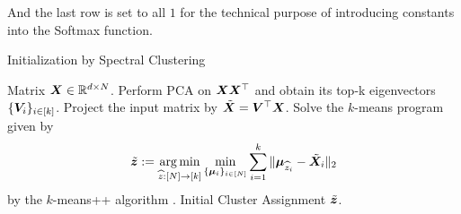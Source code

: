 And the last row is set to all $1$ for the technical purpose of introducing constants into the Softmax function. 
\begin{algorithm}[tb]
   \caption{Initialization by Spectral Clustering}
   \label{alg:example}
\begin{algorithmic}
    Matrix $\boldsymbol{X}\in\mathbb{R}^{d\times N}$.
   \STATE Perform PCA on $\boldsymbol{X}\boldsymbol{X}^\top$ and obtain its top-k eigenvectors $\{\boldsymbol{V}_i\}_{i\in[k]}$.
   \STATE Project the input matrix by $\tilde{\boldsymbol{X}}=\boldsymbol{V}^\top \boldsymbol{X}$.
   \STATE Solve the $k$-means program given by 
   \begin{align*}
       \tilde{\boldsymbol{z}}:=\operatorname*{arg\,min}_{\widehat{z}:[N]\to [k]}\min_{\{\boldsymbol{\mu}_i\}_{i\in[N]}}\sum_{i=1}^k\Vert\boldsymbol{\mu}_{\widehat{z}_i}- \tilde{\boldsymbol{X}}_i\Vert_2
   \end{align*}
   by the $k$-means++ algorithm \citep{kumar2004simple}.
    Initial Cluster Assignment $\tilde{\boldsymbol{z}}$.
\end{algorithmic}
\end{algorithm}


